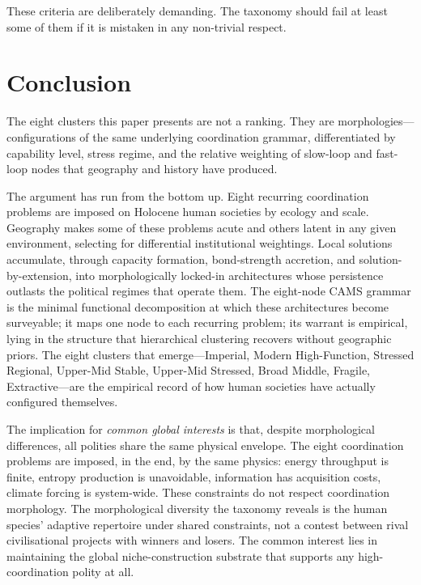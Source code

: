 \documentclass[12pt,a4paper]{article}
\begin{document}
These criteria are deliberately demanding. The taxonomy should fail at least some of them if it is mistaken in any non-trivial respect.

\section{Conclusion}

The eight clusters this paper presents are not a ranking. They are morphologies---configurations of the same underlying coordination grammar, differentiated by capability level, stress regime, and the relative weighting of slow-loop and fast-loop nodes that geography and history have produced.

The argument has run from the bottom up. Eight recurring coordination problems are imposed on Holocene human societies by ecology and scale. Geography makes some of these problems acute and others latent in any given environment, selecting for differential institutional weightings. Local solutions accumulate, through capacity formation, bond-strength accretion, and solution-by-extension, into morphologically locked-in architectures whose persistence outlasts the political regimes that operate them. The eight-node CAMS grammar is the minimal functional decomposition at which these architectures become surveyable; it maps one node to each recurring problem; its warrant is empirical, lying in the structure that hierarchical clustering recovers without geographic priors. The eight clusters that emerge---Imperial, Modern High-Function, Stressed Regional, Upper-Mid Stable, Upper-Mid Stressed, Broad Middle, Fragile, Extractive---are the empirical record of how human societies have actually configured themselves.

The implication for \textit{common global interests} is that, despite morphological differences, all polities share the same physical envelope. The eight coordination problems are imposed, in the end, by the same physics: energy throughput is finite, entropy production is unavoidable, information has acquisition costs, climate forcing is system-wide. These constraints do not respect coordination morphology. The morphological diversity the taxonomy reveals is the human species' adaptive repertoire under shared constraints, not a contest between rival civilisational projects with winners and losers. The common interest lies in maintaining the global niche-construction substrate that supports any high-coordination polity at all.
\end{document}
